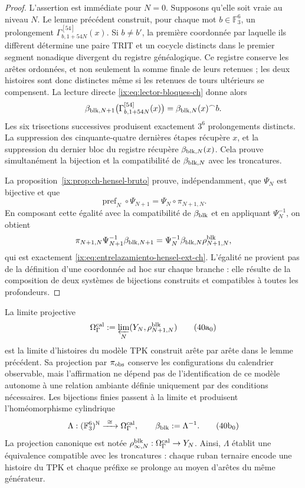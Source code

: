 \begin{proof}
L’assertion est immédiate pour \(N=0\). Supposons qu’elle soit vraie au niveau
\(N\). Le lemme précédent construit, pour chaque mot
\(b\in\mathbb F_3^6\), un prolongement
    \(\Gamma_{b,1+54N}^{[54]}(x)\). Si \(b\ne b'\), la première coordonnée par laquelle
ils diffèrent détermine une paire TRIT et un cocycle distincts dans le premier
segment nonadique divergent du registre généalogique. Ce registre conserve
les arêtes ordonnées, et non seulement la somme finale de leurs retenues ; les deux
histoires sont donc distinctes même si les retenues de tours ultérieurs se
compensent. La lecture directe \eqref{ix:eq:lector-bloques-ch} donne alors
\begin{equation}
 \beta_{{\rm blk},N+1}
 \bigl(\Gamma_{b,1+54N}^{[54]}(x)\bigr)
 =\beta_{{\rm blk},N}(x)^\frown b.
 \label{ix:eq:beta-concatenacion-demostrada-ch}
\end{equation}
Les six trisections successives produisent exactement \(3^6\) prolongements distincts. La suppression des cinquante-quatre dernières étapes récupère \(x\), et la suppression du dernier bloc du registre récupère \(\beta_{{\rm blk},N}(x)\). Cela prouve simultanément la bijection et la compatibilité de \(\beta_{{\rm blk},N}\) avec les troncatures.

La proposition~\ref{ix:prop:ch-hensel-bruto} prouve, indépendamment, que
\(\Psi_N\) est bijective et que
\[
 \operatorname{pref}_N\circ\Psi_{N+1}
 =\Psi_N\circ\pi_{N+1,N}.
\]
En composant cette égalité avec la compatibilité de \(\beta_{\rm blk}\) et en
appliquant \(\Psi_N^{-1}\), on obtient
\[
 \pi_{N+1,N}\Psi_{N+1}^{-1}\beta_{{\rm blk},N+1}
 =\Psi_N^{-1}\beta_{{\rm blk},N}\rho^{\rm blk}_{N+1,N},
\]
qui est exactement \eqref{ix:eq:entrelazamiento-hensel-ext-ch}. L’égalité ne
provient pas de la définition d’une coordonnée ad hoc sur chaque branche : elle résulte de la composition
de deux systèmes de bijections construits et compatibles à toutes les
profondeurs.
\end{proof}

La limite projective
\[
 \Omega_\Gamma^{\rm cal}:=
 \varprojlim_N(Y_N,\rho^{\rm blk}_{N+1,N})
\tag{40a$_0$}
\label{ix:eq:omega-gamma-catalogal-ch}
\]
est la limite d'histoires du modèle TPK construit arête par arête dans le lemme précédent. Sa projection par \(\pi_{\rm obs}\) conserve les configurations du calendrier observable, mais l'affirmation ne dépend pas de l'identification de ce modèle autonome à une relation ambiante définie uniquement par des conditions nécessaires. Les bijections finies passent à la limite et produisent l'homéomorphisme cylindrique
\[
 \Lambda:(\mathbb F_3^6)^{\mathbb N}
 \xrightarrow{\ \cong\ }\Omega_\Gamma^{\rm cal},
 \qquad
 \beta_{\rm blk}:=\Lambda^{-1}.
\tag{40b$_0$}
\label{ix:eq:homeomorfismo-calibrado-ch}
\]
La projection canonique est notée
\(\rho^{\rm blk}_{\infty,N}:\Omega_\Gamma^{\rm cal}\to Y_N\).
Ainsi, \(\Lambda\) établit une équivalence compatible avec les
troncatures : chaque ruban ternaire encode une histoire du TPK et chaque
préfixe se prolonge au moyen d’arêtes du même générateur.

